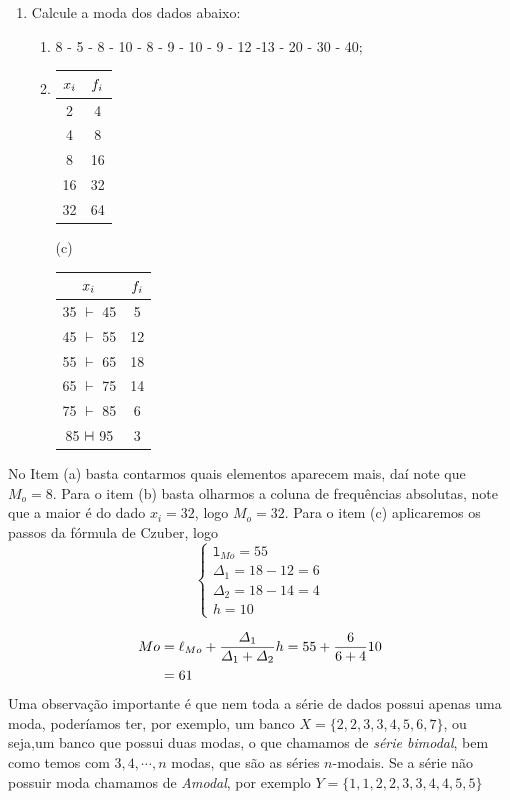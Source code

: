 \exemplo
\begin{enumerate}
    \item[(i)] Calcule a moda dos dados abaixo:
	\begin{enumerate}
	    \item[(a)] 8 - 5 - 8 - 10 - 8 - 9 - 10 - 9 - 12 -13 - 20 - 30 - 40;
		\item[(b)] \begin{tabular}{cc}
	    	\hline
			$\mathnormal{x_i}$ & $\mathnormal{f_i}$\\
			\hline
			2 & 4 \\
			4 & 8 \\
			8 & 16 \\
			16 & 32 \\
			32 & 64 \\
			\hline
		\end{tabular}
		\qquad \qquad (c) \begin{tabular}{cc}
			\hline
			$\mathnormal{x_i}$ & $\mathnormal{f_i}$\\
			\hline
			35 $\vdash$ 45 & 5\\
			45 $\vdash$ 55 & 12\\
			55 $\vdash$ 65 & 18\\
			65 $\vdash$ 75 & 14\\
			75 $\vdash$ 85 & 6\\
			85 $\vdash \hspace{-0.2 cm }\dashv$ 95 & 3\\
			\hline
		\end{tabular}
	\end{enumerate}
\end{enumerate}

\inic No Item (a) basta contarmos quais elementos aparecem mais, daí note que $M_o = 8$. Para o item (b) basta olharmos a coluna de frequências absolutas, note que a maior é do dado $x_i = 32$, logo $M_o = 32$. Para o item (c) aplicaremos os passos da fórmula de Czuber, logo \begin{equation*}
    \begin{cases}
        \mathtt{l}_{Mo} = 55\\
        \Delta_1 = 18-12 = 6\\
        \Delta_2 = 18- 14 = 4\\
        h = 10
    \end{cases}
\end{equation*}


\begin{align*}
    \mathnormal{Mo} &= \ell_{Mo} + \frac{\mathnormal{\Delta}_1}{\mathnormal{\Delta}_1 + \mathnormal{\Delta}_2}\mathnormal{h} = 55 + \frac{6}{6+4}10\\
    &= 61
\end{align*}
\inic Uma observação importante é que nem toda a série de dados possui apenas uma moda, poderíamos ter, por exemplo, um banco $X = \{2,2,3,3,4,5,6,7\}$, ou seja,um banco que possui duas modas, o que chamamos de \textit{série bimodal}, bem como temos com $3,4,\cdots, n$ modas, que são as séries $n$-modais. Se a série não possuir moda chamamos de \textit{Amodal}, por exemplo $Y = \{1,1,2,2,3,3,4,4,5,5\}$ 

